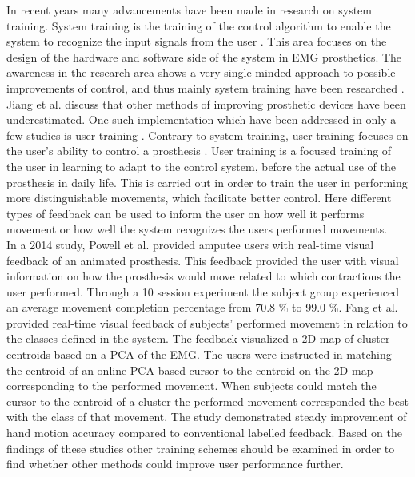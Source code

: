 In recent years many advancements have been made in research on system training. System training is the training of the control algorithm to enable the system to recognize the input signals from the user \cite{Fougner2012}. This area focuses on the design of the hardware and software side of the system in EMG prosthetics. %
The awareness in the research area shows a very single-minded approach to possible improvements of control, and thus mainly system training have been researched \cite{Jiang2012}. Jiang et al. \cite{Jiang2012} discuss that other methods of improving prosthetic devices have been underestimated. One such implementation which have been addressed in only a few studies is user training \cite{Powell2014, Fang2017, Pan2017}. Contrary to system training, user training focuses on the user's ability to control a prosthesis \cite{Fougner2012}. User training is a focused training of the user in learning to adapt to the control system, before the actual use of the prosthesis in daily life. This is carried out in order to train the user in performing more distinguishable movements, which facilitate better control. Here different types of feedback can be used to inform the user on how well it performs movement or how well the system recognizes the users performed movements. \cite{Powell2014, Simon2013} \\
In a 2014 study, Powell et al. \cite{Powell2014} provided amputee users with real-time visual feedback of an animated prosthesis. This feedback provided the user with visual information on how the prosthesis would move related to which contractions the user performed. Through a 10 session experiment the subject group experienced an average movement completion percentage from 70.8 \% to 99.0 \%. %
Fang et al. \cite{Fang2017} provided real-time visual feedback of subjects' performed movement in relation to the classes defined in the system. The feedback visualized a 2D map of cluster centroids based on a PCA of the EMG. The users were instructed in matching the centroid of an online PCA based cursor to the centroid on the 2D map corresponding to the performed movement. When subjects could match the cursor to the centroid of a cluster the performed movement corresponded the best with the class of that movement. The study demonstrated steady improvement of hand motion accuracy compared to conventional labelled feedback. \cite{Fang2017} Based on the findings of these studies other training schemes should be examined in order to find whether other methods could improve user performance further. 

